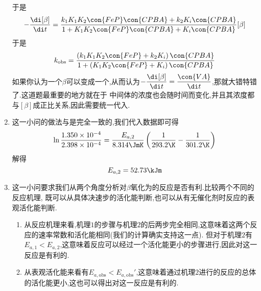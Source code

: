 \documentclass{ctexart}
\begin{document}
\begin{solution}
\begin{enumerate}[label=\tbf{\arabic{Pcounter}-\arabic*},topsep=0pt,parsep=0pt,itemsep=0pt,partopsep=0pt]
            于是
            \[-\dfrac{\di[\beta]}{\di t}=\dfrac{k_1K_1K_2\con{FeP}\con{CPBA}+k_2K_i\con{CPBA}}{1+K_1K_2\con{FeP}\con{CPBA}+K_i\con{CPBA}}[\beta]\]
            于是
            \[k_{\text{obs}}=\dfrac{\left(k_1K_1K_2\con{FeP}+k_2K_i\right)\con{CPBA}}{1+\left(K_1K_2\con{FeP}+K_i\right)\con{CPBA}}\]
            如果你认为一个$\beta$可以变成一个,从而认为$-\dfrac{\di[\beta]}{\di t}=\dfrac{\con{VA}}{\di t}$,那就大错特错了.这道题最重要的地方就在于%
            中间体的浓度也会随时间而变化,并且其浓度都与$[\beta]$成正比关系,因此需要统一代入.
        \item 这一小问的做法与是完全一致的,我们代入数据即可得
            \[\ln\dfrac{1.350\times10^{-4}}{2.398\times10^{-4}}=\dfrac{E_{a,2}}{8.314\JmK}\left(\dfrac{1}{293.2\K}-\dfrac{1}{301.2\K}\right)\]
            解得
            \[E_{a,2}=52.73\kJm\]
        \item 这一小问要求我们从两个角度分析对$\beta$氧化为的反应是否有利.比较两个不同的反应机理,%
            既可以从具体决速步的活化能判断,也可以从有无催化剂时反应的表观活化能判断.
            \begin{enumerate}[label=\tbf{\arabic{Pcounter}-4-\arabic*},topsep=0pt,parsep=0pt,itemsep=0pt,partopsep=0pt,leftmargin=10pt]
                \item 从反应机理来看,机理$1$的步骤与机理$2$的后两步完全相同,这意味着这两个反应的速率常数和活化能相同(我们的计算确实支持这一点).%
                    但对于机理$2$有$E_{a,1}<E_{a,2}$,这意味着反应可以经过一个活化能更小的步骤进行,因此对这一反应是有利的.
                \item 从表观活化能来看有$E_{a,\text{obs}}<E_{a,\text{obs}}'$,这意味着通过机理$2$进行的反应的总体的活化能更小,这也可以得出对这一反应是有利的.
            \end{enumerate}
    \end{enumerate}
\end{solution}
\end{document}
